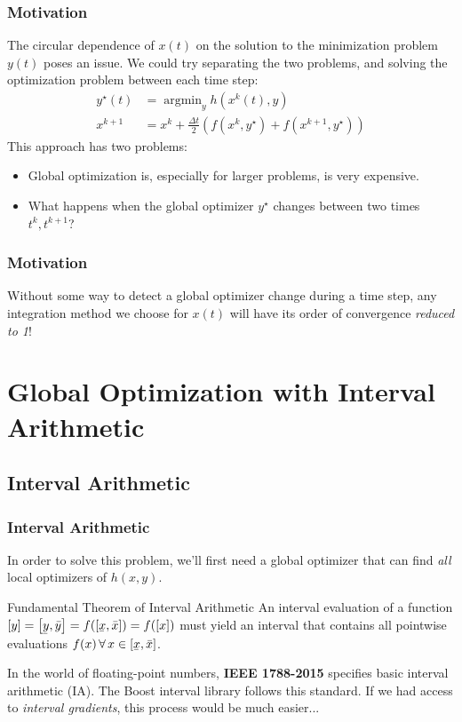 \documentclass[10pt]{beamer}
\DeclareMathOperator*{\argmin}{\arg\min}
\newcommand\ubar[1]{\underaccent{\bar}{#1}}
\begin{document}
\begin{frame}
	\frametitle{Motivation}
	The circular dependence of $x(t)$ on the solution to the minimization problem $y(t)$ poses an issue. We could try separating the two problems, and solving the optimization problem between each time step:
	\vfill
	\begin{equation}
		\begin{aligned}
			\label{eq:bad-time-stepping}
			y^\star(t) &= \argmin_y h(x^k(t), y)\\
			x^{k+1} &= x^{k} + \frac{\Delta t}{2}\left(f(x^k, y^\star) + f(x^{k+1}, y^\star)\right)
		\end{aligned}
	\end{equation}
	\vfill
	This approach has two problems:
	\begin{itemize}
		\item Global optimization is, especially for larger problems, is very expensive.
		\item What happens when the global optimizer $y^\star$ changes between two times $t^{k}, t^{k+1}$?
	\end{itemize}
\end{frame}

\begin{frame}
	\frametitle{Motivation}
	\vfill
	Without some way to detect a global optimizer change during a time step, any integration method we choose for $x(t)$ will have its order of convergence \textit{reduced to 1}!
\end{frame}

\section{Global Optimization with Interval Arithmetic}

\subsection{Interval Arithmetic}
\begin{frame}
	\frametitle{Interval Arithmetic}
	In order to solve this problem, we'll first need a global optimizer that can find \textit{all} local optimizers of $h(x, y)$.
	\vfill
	\begin{block}{Fundamental Theorem of Interval Arithmetic \supercite{hickeyIntervalArithmeticPrinciples2001}} 
		An interval evaluation of a function $\left[y\right] = \left[\ubar{y},\bar{y}\right] = f(\left[\ubar x, \bar x\right])=f([x])$ must yield an interval that contains all pointwise evaluations $f(x)\,\forall\,x\in\left[\ubar x, \bar x\right]$.
	\end{block}
	In the world of floating-point numbers, \textbf{IEEE 1788-2015} specifies basic interval arithmetic (IA). The Boost interval library\supercite{melquiondBoostIntervalLibrary2022} follows this standard.
	\vfill
	\vfill
	If we had access to \textit{interval gradients}, this process would be much easier...
	\vfill
\end{frame}
\end{document}
